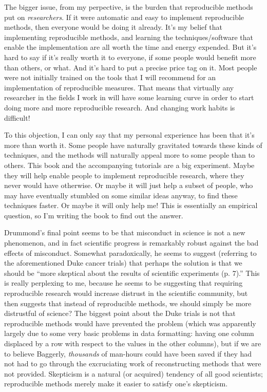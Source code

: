 \documentclass{book}
\begin{document}
The bigger issue, from my perpective, is the burden that reproducible methods put on \emph{researchers}. If it were automatic and easy to implement reproducible methods, then everyone would be doing it already. It's my belief that implementing reproducible methods, and learning the techniques/software that enable the implementation are all worth the time and energy expended. But it's hard to say if it's really worth it to everyone, if some people would benefit more than others, or what.  And it's hard to put a precise price tag on it.  Most people were not initially trained on the tools that I will recommend for an implementation of reproducible measures. That means that virtually any researcher in the fields I work in will have some learning curve in order to start doing more and more reproducible research. And changing work habits is difficult!

To this objection, I can only say that my personal experience has been that it's more than worth it. Some people have naturally gravitated towards these kinds of techniques, and the methods will naturally appeal more to some people than to others. This book and the accompanying tutorials are a big experiment. Maybe they will help enable people to implement reproducible research, where they never would have otherwise. Or maybe it will just help a subset of people, who may have eventually stumbled on some similar ideas anyway, to find these techniques faster. Or maybe it will only help me!  This is essentially an empirical question, so I'm writing the book to find out the answer.

Drummond's final point seems to be that misconduct in science is not a new phenomenon, and in fact scientific progress is remarkably robust against the bad effects of misconduct. Somewhat paradoxically, he seems to suggest (referring to the aforementioned Duke cancer trials) that perhaps the solution is that we should be ``more skeptical about the results of scientific experiments (p. 7).'' This is really perplexing to me, because he seems to be suggesting that requiring reproducible research would increase distrust in the scientific community, but then suggests that instead of reproducible methods, we should simply be more distrustful of science? The biggest point about the Duke trials is not that reproducible methods would have prevented the problem (which was apparently largely due to some very basic problems in data formatting: having one column displaced by a row with respect to the values in the other columns), but if we are to believe Baggerly, \emph{thousands} of man-hours could have been saved if they had not had to go through the excruciating work of reconstructing methods that were not provided. Skepticism is a natural (or acquired) tendency of all good scientists; reproducible methods merely make it easier to satisfy one's skepticism.
\end{document}
